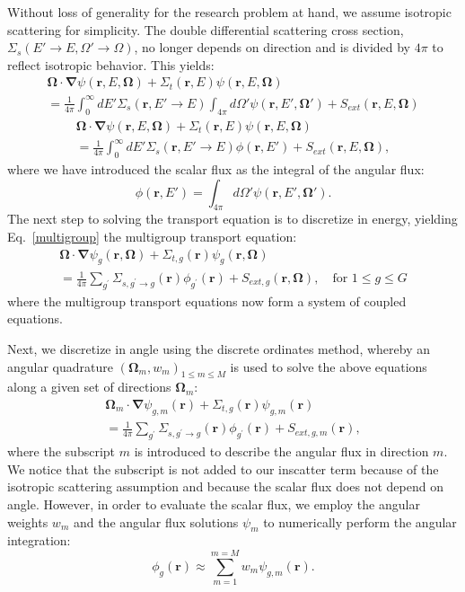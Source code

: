 \documentclass{anstrans}
\renewcommand{\vec}[1]{\bm{#1}} %
\newcommand{\vr}{\vec{r}}
\newcommand{\vo}{\vec{\Omega}}
\begin{document}
Without loss of generality for the research problem at hand, we assume isotropic scattering for simplicity. The double differential scattering cross section, $\Sigma_s(E'\to E, \Omega'\to\Omega)$, no longer depends on direction and is divided by $4\pi$ to reflect isotropic behavior. This yields:
\begin{multline}
\label{isotropic}
\vo \cdot \vec \nabla \psi(\vr,E,\vo) +\Sigma_t(\vr,E) \psi(\vr,E,\vo) \\ = \frac{1}{4\pi}\int_{0}^{\infty}dE' \Sigma_s(\vr,E'\to E) \int_{4\pi}d\Omega' \psi(\vr,E',\vo')  + S_{ext}(\vr,E,\vo) \nonumber
\end{multline}
\begin{multline}
\vo \cdot \vec \nabla \psi(\vr,E,\vo) +\Sigma_t(\vr,E) \psi(\vr,E,\vo) \\= \frac{1}{4\pi}\int_{0}^{\infty}dE' \Sigma_s(\vr,E'\to E) \phi(\vr,E')  + S_{ext}(\vr,E,\vo) ,
\end{multline}
where we have introduced the scalar flux as the integral of the angular flux:
\begin{equation}
\label{def_scalar_flux}
\phi(\vr,E') = \int_{4\pi}d\Omega' \psi(\vr,E',\vo').
\end{equation}
The next step to solving the transport equation is to discretize in energy, yielding Eq.~\eqref{multigroup} the multigroup transport equation:
\begin{multline}
\vo \cdot \vec \nabla \psi_g(\vr,\vo) +\Sigma_{t,g}(\vr) \psi_g(\vr,\vo)\\ = \frac{1}{4\pi}\sum_{g^{\prime}}\Sigma_{s,g^{\prime}\to g}(\vr)\phi_{g^{\prime}}(\vr) + S_{ext,g}(\vr,\vo), \quad \text{for } 1 \le g \le G
\label{multigroup}
\end{multline}
where the multigroup transport equations now form a system of coupled equations. 

Next, we discretize in angle using the discrete ordinates method, whereby an angular quadrature $\left( \vo_m, w_m \right)_{1 \le m \le M}$ is used to solve the above equations along a given set of directions $\vo_m$:
\begin{multline}
\vo_m \cdot \vec \nabla \psi_{g,m}(\vr) +\Sigma_{t,g}(\vr) \psi_{g,m}(\vr)  \\= \frac{1}{4\pi}\sum_{g^{\prime}}\Sigma_{s,g^{\prime}\to g}(\vr)\phi_{g^{\prime}}(\vr) + S_{ext,g,m}(\vr),
\label{angle}
\end{multline}
where the subscript $m$ is introduced to describe the angular flux in direction $m$. We notice that the subscript is not added to our inscatter term because of the isotropic scattering assumption and because the scalar flux does not depend on angle. However, in order to evaluate the scalar flux, we employ the angular weights $w_m$ and the angular flux solutions
$\psi_m$ to numerically perform the angular integration:
\begin{equation}
\label{def_scalar_flux_2}
\phi_g(\vr) \approx \sum_{m=1}^{m=M} w_m \psi_{g,m}(\vr).
\end{equation}
\end{document}
